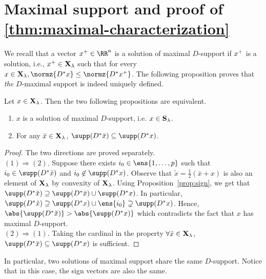 \section{Maximal support and proof of \cref{thm:maximal-characterization}}
\label{sec:max}

We recall that a vector $\maxx \in \RR^n$ is a solution of maximal $D$-support if $x^+$ is a solution, i.e., $x^+ \in \mathbf{X}_{\lambda}$ such that for every $x \in \Xl, \normz{D^* x} \leq \normz{D^* \maxx}$.
The following proposition proves that \emph{the} $D$-maximal support is indeed
uniquely defined.
\begin{proposition}
  Let $x \in \mathbf{X}_{\lambda}$.
  Then the two following propositions are equivalent.
  \begin{enumerate}
  \item $x$ is a solution of maximal $D$-support, i.e. $x \in \mathbf{S}_{\lambda}$.
  \item For any $\bar{x} \in \mathbf{X}_{\lambda}$, $\supp(D^* \bar{x}) \subseteq \supp(D^* x)$.
  \end{enumerate}
\end{proposition}
\begin{proof}
  The two directions are proved separately.\\
  $(1) \Rightarrow (2)$.
  Suppose there exists $i_0 \in \ens{1,\dots,p}$ such that $i_0 \in \supp(D^* \bar{x})$ and $i_0 \not\in \supp(D^* x)$.
  Observe that $\tilde x = \frac{1}{2}(\bar{x} + x)$ is also an element of $\mathbf{X}_{\lambda}$ by convexity of $\mathbf{X}_{\lambda}$.
  Using Proposition~\ref{prop:sign}, we get that $\supp(D^* \tilde x) \supseteq \supp(D^* \bar{x}) \cup \supp(D^* x)$.
  In particular, $\supp(D^* \tilde x) \supseteq \supp(D^* x) \cup \ens{i_0} \supsetneq \supp(D^* x)$.
  Hence, $\abs{\supp(D^* \tilde x)} > \abs{\supp(D^* x)}$ which contradicts the fact that $x$ has maximal $D$-support.\\
  $(2) \Rightarrow (1)$.
  Taking the cardinal in the property $\forall \bar{x} \in \mathbf{X}_{\lambda}$, $\supp(D^* \bar{x}) \subseteq \supp(D^* x)$ is sufficient.
\end{proof}
In particular, two solutions of maximal support share the same $D$-support. Notice that in this case, the sign vectors are also the same.

